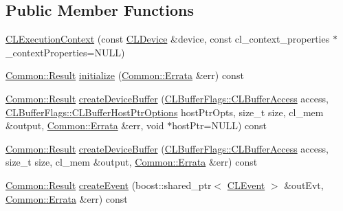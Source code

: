 \subsection*{Public Member Functions}
\begin{DoxyCompactItemize}
\item 
\hyperlink{class_c_l_ray_tracer_1_1_open_c_l_utils_1_1_c_l_execution_context_a4c95e31f2a4dd4127406edbb0ba5edd1}{C\+L\+Execution\+Context} (const \hyperlink{class_c_l_ray_tracer_1_1_open_c_l_utils_1_1_c_l_device}{C\+L\+Device} \&device, const cl\+\_\+context\+\_\+properties $\ast$\+\_\+context\+Properties=N\+U\+LL)
\item 
\hyperlink{_errata_8h_a389396702f1aff6e71eb21328b0775c1}{Common\+::\+Result} \hyperlink{class_c_l_ray_tracer_1_1_open_c_l_utils_1_1_c_l_execution_context_a6b4b2a9f1e8bd3ff516c7bbae4848f61}{initialize} (\hyperlink{class_c_l_ray_tracer_1_1_common_1_1_errata}{Common\+::\+Errata} \&err) const 
\item 
\hyperlink{_errata_8h_a389396702f1aff6e71eb21328b0775c1}{Common\+::\+Result} \hyperlink{class_c_l_ray_tracer_1_1_open_c_l_utils_1_1_c_l_execution_context_a5a953bbfdd89bd898ad2e6ad55c9f634}{create\+Device\+Buffer} (\hyperlink{_c_l_execution_context_8h_a354d4612d8d46b32eb5ad4a71f35694c}{C\+L\+Buffer\+Flags\+::\+C\+L\+Buffer\+Access} access, \hyperlink{_c_l_execution_context_8h_a8e119b9b799e2e980fe86c8e6c93cca6}{C\+L\+Buffer\+Flags\+::\+C\+L\+Buffer\+Host\+Ptr\+Options} host\+Ptr\+Opts, size\+\_\+t size, cl\+\_\+mem \&output, \hyperlink{class_c_l_ray_tracer_1_1_common_1_1_errata}{Common\+::\+Errata} \&err, void $\ast$host\+Ptr=N\+U\+LL) const 
\item 
\hyperlink{_errata_8h_a389396702f1aff6e71eb21328b0775c1}{Common\+::\+Result} \hyperlink{class_c_l_ray_tracer_1_1_open_c_l_utils_1_1_c_l_execution_context_aa8d5e3b745f6c543f2a78c6fd514a79d}{create\+Device\+Buffer} (\hyperlink{_c_l_execution_context_8h_a354d4612d8d46b32eb5ad4a71f35694c}{C\+L\+Buffer\+Flags\+::\+C\+L\+Buffer\+Access} access, size\+\_\+t size, cl\+\_\+mem \&output, \hyperlink{class_c_l_ray_tracer_1_1_common_1_1_errata}{Common\+::\+Errata} \&err) const 
\item 
\hyperlink{_errata_8h_a389396702f1aff6e71eb21328b0775c1}{Common\+::\+Result} \hyperlink{class_c_l_ray_tracer_1_1_open_c_l_utils_1_1_c_l_execution_context_a01b25e47be24d16008b53e5f6431b807}{create\+Event} (boost\+::shared\+\_\+ptr$<$ \hyperlink{class_c_l_ray_tracer_1_1_open_c_l_utils_1_1_c_l_event}{C\+L\+Event} $>$ \&out\+Evt, \hyperlink{class_c_l_ray_tracer_1_1_common_1_1_errata}{Common\+::\+Errata} \&err) const 

\end{DoxyCompactItemize}
